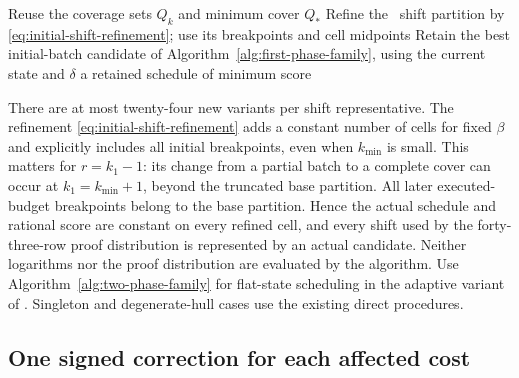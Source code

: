 \begin{algorithm}[H]
\caption{Two modified initial budgets for \ExpectedTree}
\label{alg:two-phase-family}
Reuse the coverage sets $Q_k$ and minimum cover $Q_*$\;
Refine the \BatchOrders\ shift partition by
\eqref{eq:initial-shift-refinement}; use its breakpoints and cell midpoints\;
Retain the best initial-batch candidate of
Algorithm~\ref{alg:first-phase-family}, using the current state and $\delta$\;
\KwRet a retained schedule of minimum score\;
\end{algorithm}

There are at most twenty-four new variants per shift representative.
The refinement \eqref{eq:initial-shift-refinement} adds a constant
number of cells for fixed $\beta$ and explicitly includes all
initial breakpoints, even when $k_{\min}$ is small. This matters
for $r=k_1-1$: its change from a partial batch to a complete cover
can occur at $k_1=k_{\min}+1$, beyond the truncated base partition.
All later executed-budget breakpoints belong to the base partition.
Hence the actual schedule and rational score are constant on every
refined cell, and every shift used by the forty-three-row proof
distribution is represented by an actual candidate. Neither logarithms
nor the proof distribution are evaluated by the algorithm.
Use Algorithm~\ref{alg:two-phase-family} for flat-state scheduling
in the adaptive variant of \ExpectedTree. Singleton and degenerate-hull
cases use the existing direct procedures.



\subsection{One signed correction for each affected cost}

